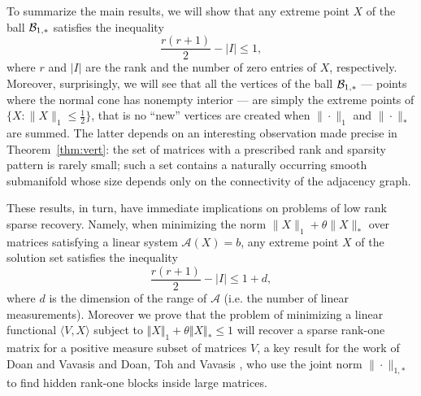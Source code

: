 \documentclass[smallextended,numbook]{svjour3}
\begin{document}
To summarize the main results, we will show that any extreme point $X$ of the ball ${{\cal B}}_{1,*}$ satisfies the inequality
\begin{equation}\label{eqn:rank_sparse}
\frac{r(r+1)}{2}- |I|\leq 1,
\end{equation}
where $r$ and $|I|$ are the rank 
and the number of zero entries of $X$, respectively.
Moreover, surprisingly, we will see that all the vertices of the ball 
${{\cal B}}_{1,*}$  --- points where the normal cone has nonempty interior --- are simply the extreme points of  $\{X: \|X\|_1\leq \frac{1}{2}\}$, that is no ``new'' vertices are created when $\|\cdot\|_1$ and $\|\cdot\|_*$ are summed. The latter depends on an interesting observation made precise in Theorem~\ref{thm:vert}: the set of matrices with a prescribed rank and sparsity pattern is rarely small; such a set contains a naturally occurring smooth submanifold whose size depends only on the connectivity of the adjacency graph. 

These results, in turn, have immediate implications on problems of low rank sparse recovery. Namely, when minimizing the norm $\|X\|_1 +\theta \|X\|_{*}$ over matrices satisfying a linear system $\mathcal{A}(X)=b$, any extreme point $X$ of the solution set
satisfies the inequality
\begin{equation}\label{eqn:rank_sparse_opt}
\frac{r(r+1)}{2}-|I| \leq 1 +d,
\end{equation}
where $d$ is the dimension of the range of $\mathcal{A}$ (i.e. the number of linear measurements). Moreover we prove that the problem of minimizing a linear functional $\langle V, X\rangle$ subject to $\Vert X\Vert_1 + \theta \Vert X\Vert_*\le 1$ will
recover a sparse rank-one matrix for a positive measure subset of matrices $V$, a key result for the work of Doan and Vavasis \cite{DV13} and Doan, Toh and Vavasis \cite{prox_norm}, who use the joint norm $\| \cdot\|_{1,*}$ to find hidden rank-one blocks inside large matrices. 
\end{document}
